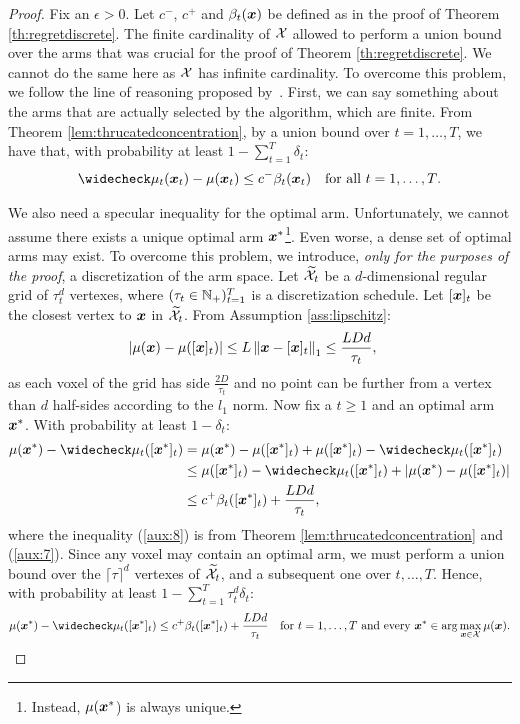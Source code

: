 \documentclass{article}
\begin{document}
\regretcompact*
\begin{proof}
	Fix an $\epsilon>0$. Let $c^{-}$, $c^{+}$ and $\beta_t(\vx)$ be defined as in the proof of Theorem \ref{th:regretdiscrete}.
	The finite cardinality of $\Xspace$ allowed to perform a union bound over the arms that was crucial for the proof of Theorem \ref{th:regretdiscrete}. We cannot do the same here as $\Xspace$ has infinite cardinality. To overcome this problem, we follow the line of reasoning proposed by~\citet{srinivas2009gaussian}. First, we can say something about the arms that are actually selected by the algorithm, which are finite. From Theorem \ref{lem:thrucatedconcentration}, by a union bound over $t=1,\dots,T$, we have that, with probability at least $1-\sum_{t=1}^T\delta_t$:
	\begin{align}\label{aux:6}
		&\wc{\mu_t}(\vx_t) - \mu(\vx_t) \leq c^{-}\beta_t(\vx_t) &\text{for all $t=1,\dots,T$}.
	\end{align}
	
	We also need a specular inequality for the optimal arm. Unfortunately, we cannot assume there exists a unique optimal arm $\vx^*$\footnote{Instead, $\mu(\vx^*$) is always unique.}. Even worse, a dense set of optimal arms may exist. To overcome this problem, we introduce, \textit{only for the purposes of the proof}, a discretization of the arm space. Let $\wt{\Xspace}_t$ be a $d$-dimensional regular grid of $\tau_t^d$ vertexes, where $(\tau_t\in\Naturals_{+})_{t=1}^T$ is a discretization schedule. Let $[\vx]_t$ be the closest vertex to $\vx$ in $\wt{\Xspace}_t$. From Assumption \ref{ass:lipschitz}:
	\begin{align}\label{aux:7}
		&|\mu(\vx) - \mu([\vx]_t)| \leq L\norm[1]{\vx - [\vx]_t} \leq \frac{LDd}{\tau_t},
	\end{align}
	as each voxel of the grid has side $\frac{2D}{\tau_t}$ and no point can be further from a vertex than $d$ half-sides according to the $l_1$ norm. Now fix a $t\geq1$ and an optimal arm $\vx^*$. With probability at least $1-\delta_t$:
	\begin{align}
		\mu(\vx^*) - \wc{\mu}_t([\vx^*]_t) 
		&= \mu(\vx^*) - \mu([\vx^*]_t) + \mu([\vx^*]_t) - \wc{\mu}_t([\vx^*]_t)  \nonumber\\
		&\leq \mu([\vx^*]_t) - \wc{\mu}_t([\vx^*]_t) + |\mu(\vx^*) - \mu([\vx^*]_t)| \nonumber\\
		&\leq c^{+}\beta_t([\vx^*]_t) + \frac{LDd}{\tau_t}, \label{aux:8}
	\end{align}
	where the inequality (\ref{aux:8}) is from Theorem \ref{lem:thrucatedconcentration} and (\ref{aux:7}). Since any voxel may contain an optimal arm, we must perform a union bound over the $\lceil\tau\rceil^d$ vertexes of $\wt{\Xspace}_t$, and a subsequent one over $t,\dots,T$. Hence, with probability at least $1-\sum_{t=1}^{T}\tau_t^d\delta_t$:
	\begin{align}\label{aux:9}
		&\mu(\vx^*) - \wc{\mu}_t([\vx^*]_t) \leq c^{+}\beta_t([\vx^*]_t) + \frac{LDd}{\tau_t} &\text{for $t=1,\dots,T$ and every $\vx^*\in\arg\max_{\vx\in\Xspace}\mu(\vx)$}.
	\end{align}
	

\end{proof}
\end{document}
